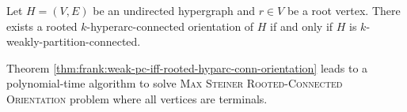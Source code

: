 \begin{theorem}\label{thm:frank:weak-pc-iff-rooted-hyparc-conn-orientation}
    Let $H = (V, E)$ be an undirected hypergraph and $r \in V$ be a root vertex. There exists a rooted $k$-hyperarc-connected orientation of $H$ if and only if $H$ is $k$-weakly-partition-connected.
\end{theorem}
Theorem \ref{thm:frank:weak-pc-iff-rooted-hyparc-conn-orientation} leads to a polynomial-time algorithm to solve \textsc{Max Steiner Rooted-Connected Orientation} problem where all vertices are terminals. 

